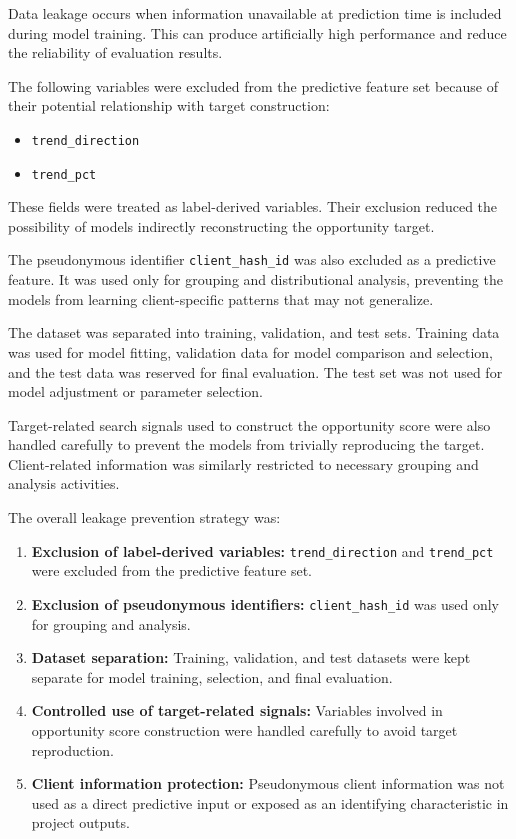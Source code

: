 \documentclass[12pt,a4paper]{report}
\begin{document}
Data leakage occurs when information unavailable at prediction time is included during model training. This can produce artificially high performance and reduce the reliability of evaluation results.

The following variables were excluded from the predictive feature set because of their potential relationship with target construction:

\begin{itemize}
    \item \texttt{trend\_direction}
    \item \texttt{trend\_pct}
\end{itemize}

These fields were treated as label-derived variables. Their exclusion reduced the possibility of models indirectly reconstructing the opportunity target.

The pseudonymous identifier \texttt{client\_hash\_id} was also excluded as a predictive feature. It was used only for grouping and distributional analysis, preventing the models from learning client-specific patterns that may not generalize.

The dataset was separated into training, validation, and test sets. Training data was used for model fitting, validation data for model comparison and selection, and the test data was reserved for final evaluation. The test set was not used for model adjustment or parameter selection.

Target-related search signals used to construct the opportunity score were also handled carefully to prevent the models from trivially reproducing the target. Client-related information was similarly restricted to necessary grouping and analysis activities.

The overall leakage prevention strategy was:

\begin{enumerate}
    \item \textbf{Exclusion of label-derived variables:} \texttt{trend\_direction} and \texttt{trend\_pct} were excluded from the predictive feature set.

    \item \textbf{Exclusion of pseudonymous identifiers:} \texttt{client\_hash\_id} was used only for grouping and analysis.

    \item \textbf{Dataset separation:} Training, validation, and test datasets were kept separate for model training, selection, and final evaluation.

    \item \textbf{Controlled use of target-related signals:} Variables involved in opportunity score construction were handled carefully to avoid target reproduction.

    \item \textbf{Client information protection:} Pseudonymous client information was not used as a direct predictive input or exposed as an identifying characteristic in project outputs.
\end{enumerate}
\end{document}

